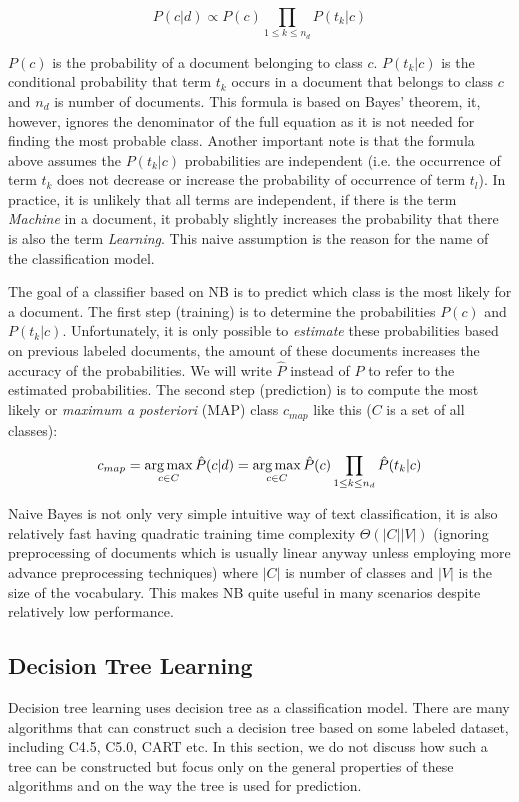 $$P(c|d) \propto P(c) \prod_{1 \leq k \leq n_d} P(t_k|c)$$ 

$P(c)$ is the probability of a document belonging to class $c$. $P(t_k|c)$ is the conditional probability that term $t_k$ occurs in a document that belongs to class $c$ and $n_d$ is number of documents. This formula is based on Bayes' theorem, it, however, ignores the denominator of the full equation as it is not needed for finding the most probable class. Another important note is that the formula above assumes the $P(t_k|c)$ probabilities are independent (i.e. the occurrence of term $t_k$ does not decrease or increase the probability of occurrence of term $t_l$). In practice, it is unlikely that all terms are independent, if there is the term \textit{Machine} in a document, it probably slightly increases the probability that there is also the term \textit{Learning}. This naive assumption is the reason for the name of the classification model.

The goal of a classifier based on NB is to predict which class is the most likely for a document. The first step (training) is to determine the probabilities $P(c)$ and $P(t_k|c)$. Unfortunately, it is only possible to \textit{estimate} these probabilities based on previous labeled documents, the amount of these documents increases the accuracy of the probabilities. We will write $\hat{P}$ instead of $P$ to refer to the estimated probabilities. The second step (prediction) is to compute the most likely or \textit{maximum a posteriori} (MAP) class $c_{map}$ like this ($C$ is a set of all classes):

$$c_{map} = \operatorname*{arg\,max}_{c \in C} \hat{P}(c|d) = \operatorname*{arg\,max}_{c \in C} \hat{P}(c) \prod_{1 \leq k \leq n_d} \hat{P}(t_k|c)$$

Naive Bayes is not only very simple intuitive way of text classification, it is also relatively fast having quadratic training time complexity $\Theta(|C||V|)$ (ignoring preprocessing of documents which is usually linear anyway unless employing more advance preprocessing techniques) where $|C|$ is number of classes and $|V|$ is the size of the vocabulary. This makes NB quite useful in many scenarios despite relatively low performance.

\subsection{Decision Tree Learning}

Decision tree learning uses decision tree as a classification model. There are many algorithms that can construct such a decision tree based on some labeled dataset, including C4.5, C5.0, CART etc. In this section, we do not discuss how such a tree can be constructed but focus only on the general properties of these algorithms and on the way the tree is used for prediction.

